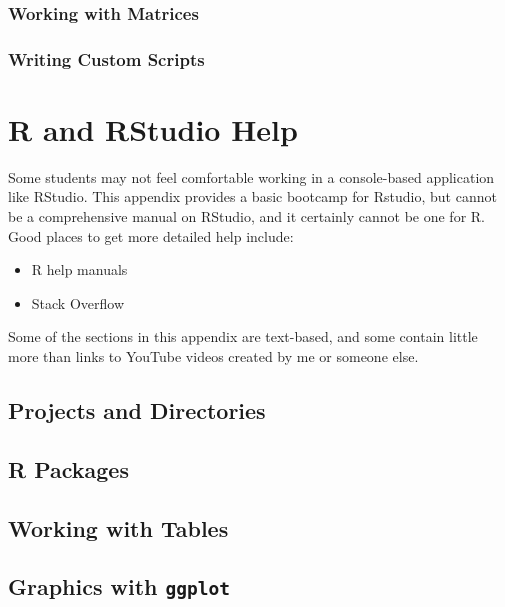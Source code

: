 \documentclass[]{book}
\providecommand{\tightlist}{%
  \setlength{\itemsep}{0pt}\setlength{\parskip}{0pt}}
\begin{document}
\hypertarget{working-with-matrices}{%
\subsection{Working with Matrices}\label{working-with-matrices}}

\hypertarget{writing-custom-scripts}{%
\subsection{Writing Custom Scripts}\label{writing-custom-scripts}}

\hypertarget{app-rstudio}{%
\chapter{R and RStudio Help}\label{app-rstudio}}

Some students may not feel comfortable working in a console-based application
like RStudio. This appendix provides a basic bootcamp for Rstudio, but
cannot be a comprehensive manual on RStudio, and it certainly cannot be one for R.
Good places to get more detailed help include:

\begin{itemize}
\tightlist
\item
  R help manuals
\item
  Stack Overflow
\end{itemize}

Some of the sections in this appendix are text-based, and some contain little
more than links to YouTube videos created by me or someone else.

\hypertarget{projects-and-directories}{%
\section{Projects and Directories}\label{projects-and-directories}}

\hypertarget{r-packages}{%
\section{R Packages}\label{r-packages}}

\hypertarget{working-with-tables}{%
\section{Working with Tables}\label{working-with-tables}}

\hypertarget{graphics-with-ggplot}{%
\section{\texorpdfstring{Graphics with \texttt{ggplot}}{Graphics with ggplot}}\label{graphics-with-ggplot}}


\end{document}
